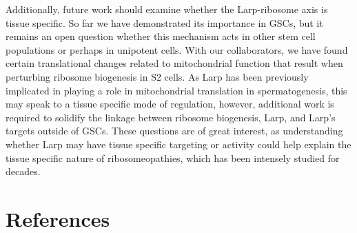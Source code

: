 \documentclass[12pt,oneside]{reedthesis}
\begin{document}
Additionally, future work should examine whether the Larp-ribosome axis is tissue specific. So far we have demonstrated its importance in GSCs, but it remains an open question whether this mechanism acts in other stem cell populations or perhaps in unipotent cells. With our collaborators, we have found certain translational changes related to mitochondrial function that result when perturbing ribosome biogenesis in S2 cells. As Larp has been previously implicated in playing a role in mitochondrial translation in spermatogenesis, this may speak to a tissue specific mode of regulation, however, additional work is required to solidify the linkage between ribosome biogenesis, Larp, and Larp's targets outside of GSCs. These questions are of great interest, as understanding whether Larp may have tissue specific targeting or activity could help explain the tissue specific nature of ribosomeopathies, which has been intensely studied for decades.

\backmatter

\hypertarget{references}{%
\chapter*{References}\label{references}}


\noindent

\setlength{\parindent}{-0.20in}
\setlength{\leftskip}{0.20in}
\setlength{\parskip}{8pt}
\end{document}
